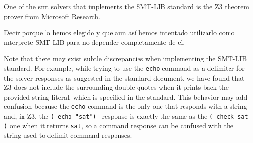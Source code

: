 One of the \gls{smt} solvers that implements the SMT-LIB standard is the Z3 theorem
prover from Microsoft Research.

Decir porque lo hemos elegido y que aun así hemos intentado utilizarlo como 
interprete SMT-LIB para no depender completamente de el.

Note that there may exist subtle discrepancies when implementing the SMT-LIB 
standard. For example, while trying to use the \verb|echo| command as a delimiter 
for the solver responses as suggested in the standard document, we have found that Z3 
does not include the surrounding double-quotes when it prints back the provided 
string literal, which is specified in the standard. This behavior may add confusion 
because the \verb|echo| command is the only one that responds with a string and, in 
Z3, the \texttt{( echo "sat") } response is exactly the same as the 
\texttt{( check-sat )} one when it returns \texttt{sat}, so a command response can be 
confused with the string used to delimit command responses.
